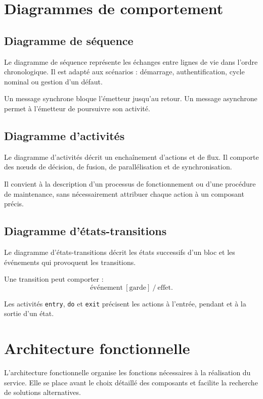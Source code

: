 \section{Diagrammes de comportement}\label{sec:is-comportement}

\subsection{Diagramme de séquence}

Le diagramme de séquence représente les échanges entre lignes de vie dans l'ordre chronologique. Il est adapté aux scénarios : démarrage, authentification, cycle nominal ou gestion d'un défaut.

Un message synchrone bloque l'émetteur jusqu'au retour. Un message asynchrone permet à l'émetteur de poursuivre son activité.

\subsection{Diagramme d'activités}

Le diagramme d'activités décrit un enchaînement d'actions et de flux. Il comporte des nœuds de décision, de fusion, de parallélisation et de synchronisation.

Il convient à la description d'un processus de fonctionnement ou d'une procédure de maintenance, sans nécessairement attribuer chaque action à un composant précis.

\subsection{Diagramme d'états-transitions}

Le diagramme d'états-transitions décrit les états successifs d'un bloc et les événements qui provoquent les transitions.

Une transition peut comporter :
\[
\text{événement}\ [\text{garde}]\ /\ \text{effet}.
\]

Les activités \texttt{entry}, \texttt{do} et \texttt{exit} précisent les actions à l'entrée, pendant et à la sortie d'un état.

\section{Architecture fonctionnelle}\label{sec:is-architecture-fonctionnelle}

L'architecture fonctionnelle organise les fonctions nécessaires à la réalisation du service. Elle se place avant le choix détaillé des composants et facilite la recherche de solutions alternatives.

